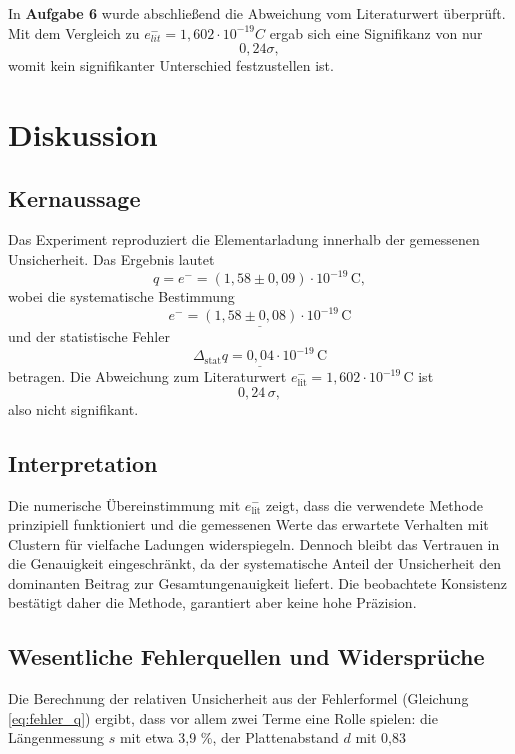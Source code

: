In \textbf{Aufgabe 6} wurde abschließend die Abweichung vom Literaturwert überprüft. Mit dem Vergleich zu $e^-_{lit} = 1,602 \cdot 10^{-19} C$ ergab sich eine Signifikanz von nur  
\[
\boxed{0,24\sigma},
\]  
womit kein signifikanter Unterschied festzustellen ist. 

\section{Diskussion}

\subsection{Kernaussage}  
Das Experiment reproduziert die Elementarladung innerhalb der gemessenen Unsicherheit. Das Ergebnis lautet
\[
\boxed{q = e^- = (1{,}58 \pm 0{,}09)\cdot 10^{-19}\,\mathrm{C}},
\]
wobei die systematische Bestimmung
\[
\underline{e^- = (1{,}58 \pm 0{,}08)\cdot 10^{-19}\,\mathrm{C}}
\]
und der statistische Fehler
\[
\underline{\Delta_{\mathrm{stat}} q = 0{,}04\cdot 10^{-19}\,\mathrm{C}}
\]
betragen. Die Abweichung zum Literaturwert $e^-_{\mathrm{lit}}=1{,}602\cdot 10^{-19}\,\mathrm{C}$ ist
\[
\boxed{0{,}24\,\sigma},
\]
also nicht signifikant.

\subsection{Interpretation}  
Die numerische Übereinstimmung mit $e^-_{\mathrm{lit}}$ zeigt, dass die verwendete Methode prinzipiell funktioniert und die gemessenen Werte das erwartete Verhalten mit Clustern für vielfache Ladungen widerspiegeln. Dennoch bleibt das Vertrauen in die Genauigkeit eingeschränkt, da der systematische Anteil der Unsicherheit den dominanten Beitrag zur Gesamtungenauigkeit liefert. Die beobachtete Konsistenz bestätigt daher die Methode, garantiert aber keine hohe Präzision.

\subsection{Wesentliche Fehlerquellen und Widersprüche}  
Die Berechnung der relativen Unsicherheit aus der Fehlerformel (Gleichung \ref{eq:fehler_q}) ergibt, dass vor allem zwei Terme eine Rolle spielen: die Längenmessung $s$ mit etwa 3,9 \%, der Plattenabstand $d$ mit 0,83 %

